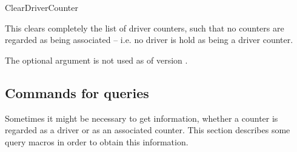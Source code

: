 \documentclass[12pt,paper=a4]{article}
\def\packageversion{\assoccntpackageversion}%
\begin{document}
\begin{docCommand}{ClearDriverCounter}{}%

This clears completely the list of driver counters, such that no counters are regarded as being associated -- i.e. no driver is hold as being a driver counter.

The optional argument is not used as of version \packageversion. 

\end{docCommand}


\subsection{Commands for queries}

Sometimes it might be necessary to get information, whether a counter is regarded as a driver or as an associated counter. This section describes some query macros in order to obtain this information.
\end{document}
